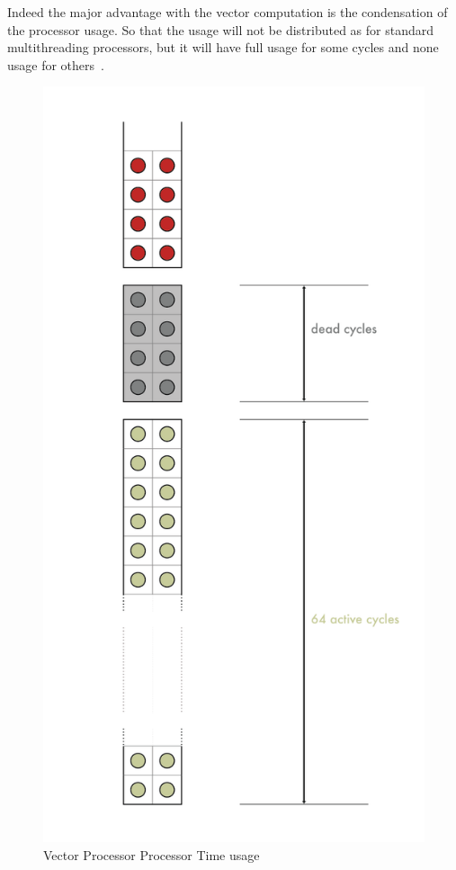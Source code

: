 Indeed the major advantage with the vector computation is the condensation of the processor usage. 
So that the usage will not be distributed as for standard multithreading processors, but it will have full usage for some cycles and none usage for others~\cite{L15-Krste}.

\begin{figure}[H]
    \centering
    \includegraphics[scale = 0.4]{Chapter_1/img/time-usage.png}
    \caption{Vector Processor Processor Time usage \cite{L15-Krste}}
    \label{Vectoring}
\end{figure}

